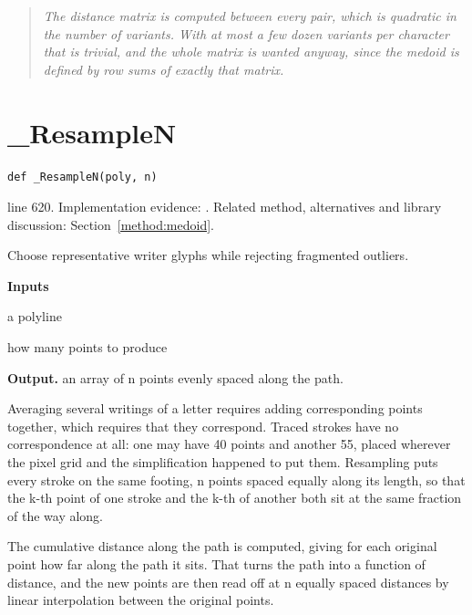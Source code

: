 \begin{quote}\small\itshape The distance matrix is computed between every pair, which is quadratic in the number of variants. With at most a few dozen variants per character that is trivial, and the whole matrix is wanted anyway, since the medoid is defined by row sums of exactly that matrix.\end{quote}


\section{\_ResampleN}\label{fn:style:-ResampleN}
\begin{lstlisting}[style=sig]
def _ResampleN(poly, n)
\end{lstlisting}
 line 620. Implementation evidence: \cite{code2026}. Related method, alternatives and library discussion: Section~\ref{method:medoid}.


Choose representative writer glyphs while rejecting fragmented outliers.




\noindent\textbf{Inputs}
\begin{description}[leftmargin=2.2em,style=nextline,font=\normalfont\ttfamily]\setlength\itemsep{1pt}
  \item[{poly}] \normalfont a polyline
  \item[{n}] \normalfont how many points to produce
\end{description}

\noindent\textbf{Output.} an array of n points evenly spaced along the path.


Averaging several writings of a letter requires adding corresponding points together, which requires that they correspond. Traced strokes have no correspondence at all: one may have 40 points and another 55, placed wherever the pixel grid and the simplification happened to put them. Resampling puts every stroke on the same footing, n points spaced equally along its length, so that the k-th point of one stroke and the k-th of another both sit at the same fraction of the way along.


The cumulative distance along the path is computed, giving for each original point how far along the path it sits. That turns the path into a function of distance, and the new points are then read off at n equally spaced distances by linear interpolation between the original points.


